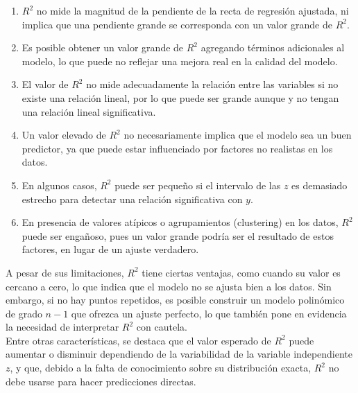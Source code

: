 \begin{enumerate} 
	\item $R^{2}$ no mide la magnitud de la pendiente de la recta de regresión ajustada, ni implica que una pendiente grande se corresponda con un valor grande de $R^{2}$. 
	
	\item Es posible obtener un valor grande de $R^{2}$ agregando términos adicionales al modelo, lo que puede no reflejar una mejora real en la calidad del modelo.
	
	\item El valor de $R^{2}$  no mide adecuadamente la relación entre las variables si no existe una relación lineal, por lo que puede ser grande aunque 
	y no tengan una relación lineal significativa. 
	
	\item Un valor elevado de $R^{2}$ no necesariamente implica que el modelo sea un buen predictor, ya que puede estar influenciado por factores no realistas en los datos.
	
	\item En algunos casos, $R^{2}$ puede ser pequeño si el intervalo de las $z$  es demasiado estrecho para detectar una relación significativa con $y$. 
	
	\item En presencia de valores atípicos o agrupamientos (clustering) en los datos, $R^{2}$ puede ser engañoso, pues un valor grande podría ser el resultado de estos factores, en lugar de un ajuste verdadero. \\
\end{enumerate}


A pesar de sus limitaciones,  $R^{2}$ tiene ciertas ventajas, como cuando su valor es cercano a cero, lo que indica que el modelo no se ajusta bien a los datos. Sin embargo, si no hay puntos repetidos, es posible construir un modelo polinómico de grado $n-1$ que ofrezca un ajuste perfecto, lo que también pone en evidencia la necesidad de interpretar  $R^{2}$ con cautela.\\

Entre otras características, se destaca que el valor esperado de  $R^{2}$ puede aumentar o disminuir dependiendo de la variabilidad de la variable independiente $z$, y que, debido a la falta de conocimiento sobre su distribución exacta,  $R^{2}$  no debe usarse para hacer predicciones directas.\\


